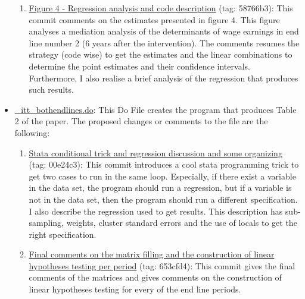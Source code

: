 \documentclass{article}
\begin{document}
\begin{itemize}
\begin{enumerate}[label=\roman*,resume]
                \item \href{https://github.com/jorgeluis8ar/Revised-reproduction-package-for-Abebe-et-al-2021/commit/58766b37ea6cfac637cf7145a142e087f2c0e8e7}{Figure 4 - Regression analysis and code description} (tag: 58766b3): This commit comments on the estimates presented in figure 4. This figure analyses a mediation analysis of the determinants of wage earnings in end line number 2 (6 years after the intervention). The comments resumes the strategy (code wise) to get the estimates and the linear combinations to determine the point estimates and their confidence intervals. Furthermore, I also realise a brief analysis of the regression that produces such results.
                
            \end{enumerate}   
            
        \item \href{https://github.com/jorgeluis8ar/Revised-reproduction-package-for-Abebe-et-al-2021/blob/main/Proposed\%20Replication\%20File/utilities/_itt_bothendlines.do}{\_itt\_bothendlines.do}: This Do File creates the program that produces Table 2 of the paper. The proposed changes or comments to the file are the following:
        
            \begin{enumerate}[label=\roman*,resume]
            
                \item \href{https://github.com/jorgeluis8ar/Revised-reproduction-package-for-Abebe-et-al-2021/commit/00e24c30c18470bd7ba3a671a93adb63077e9afe}{Stata conditional trick and regression discussion and some organizing} (tag: 00e24c3): This commit introduces a cool stata programming trick to get two cases to run in the same loop. Especially, if there exist a variable in the data set, the program should run a regression, but if a variable is not in the data set, then the program should run a different specification.  I also describe the regression used to get results. This description has sub-sampling, weights, cluster standard errors and the use of locals to get the right specification.
                
                \item \href{https://github.com/jorgeluis8ar/Revised-reproduction-package-for-Abebe-et-al-2021/commit/653cfd44a4b794d232ddeaa8e165691c94b2622e}{Final comments on the matrix filling and the construction of linear hypotheses testing per period} (tag: 653cfd4): This commit gives the final comments of the matrices and gives comments on the construction of linear hypotheses testing for every of the end line periods.
                

\end{enumerate}
\end{itemize}
\end{document}
